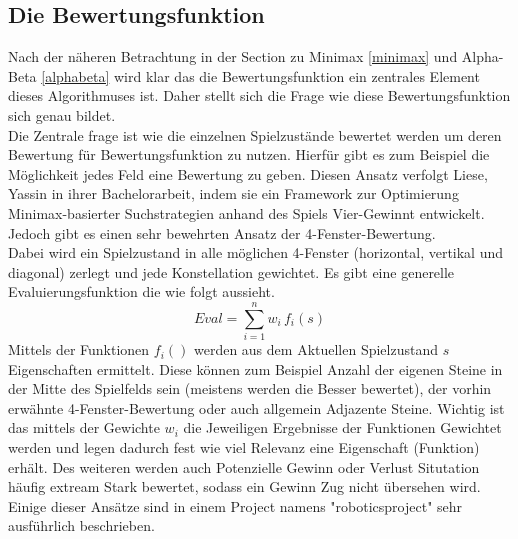 \subsection{Die Bewertungsfunktion}
\label{heuristik}
Nach der näheren Betrachtung in der Section zu Minimax \ref{minimax} und Alpha-Beta \ref{alphabeta} wird klar das die Bewertungsfunktion ein zentrales Element dieses Algorithmuses ist. Daher stellt sich die Frage wie diese Bewertungsfunktion sich genau bildet. 
\\
Die Zentrale frage ist wie die einzelnen Spielzustände bewertet werden um deren Bewertung für Bewertungsfunktion zu nutzen. Hierfür gibt es zum Beispiel die Möglichkeit jedes Feld eine Bewertung zu geben. Diesen Ansatz verfolgt Liese, Yassin \cite{Liese2024} in ihrer Bachelorarbeit, indem sie ein Framework zur Optimierung Minimax-basierter Suchstrategien anhand des Spiels Vier-Gewinnt entwickelt. Jedoch gibt es einen sehr bewehrten Ansatz der 4-Fenster-Bewertung.
\\
Dabei wird ein Spielzustand in alle möglichen 4-Fenster (horizontal, vertikal und diagonal) zerlegt und jede Konstellation gewichtet. Es gibt eine generelle Evaluierungsfunktion die wie folgt aussieht. $$Eval = \sum_{i=1}^{n} w_i\,f_i(s)$$
Mittels der Funktionen $f_i()$ werden aus dem Aktuellen Spielzustand $s$ Eigenschaften ermittelt. Diese können zum Beispiel Anzahl der eigenen Steine in der Mitte des Spielfelds sein (meistens werden die Besser bewertet), der vorhin erwähnte 4-Fenster-Bewertung oder auch allgemein Adjazente Steine. Wichtig ist das mittels der Gewichte $w_i$ die Jeweiligen Ergebnisse der Funktionen Gewichtet werden und legen dadurch fest wie viel Relevanz eine Eigenschaft (Funktion) erhält. Des weiteren werden auch Potenzielle Gewinn oder Verlust Situtation häufig extream Stark bewertet, sodass ein Gewinn Zug nicht übersehen wird. Einige dieser Ansätze sind in einem Project namens "roboticsproject" \cite{roboticsproject_connect4_algorithm} sehr ausführlich beschrieben. 

\newpage